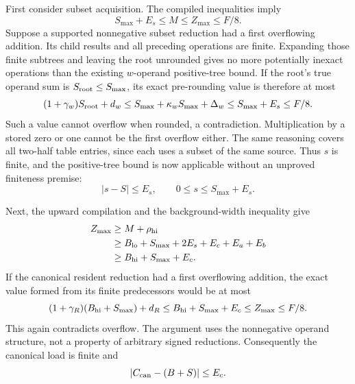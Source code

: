 \documentclass[11pt]{article}
\begin{document}
First consider subset acquisition. The compiled inequalities imply
\begin{equation}
S_{\max}+E_s\le M\le Z_{\max}\le F/8.
\label{eq:uniform-subset-margin}
\end{equation}
Suppose a supported nonnegative subset reduction had a first overflowing addition. Its child results and all preceding operations are finite. Expanding those finite subtrees and leaving the root unrounded gives no more potentially inexact operations than the existing $w$-operand positive-tree bound. If the root's true operand sum is $S_{\rm root}\le S_{\max}$, its exact pre-rounding value is therefore at most
\begin{equation}
(1+\gamma_w)S_{\rm root}+d_w
\le S_{\max}+\kappa_wS_{\max}+\Delta_w
\le S_{\max}+E_s
\le F/8.
\end{equation}
Such a value cannot overflow when rounded, a contradiction. Multiplication by a stored zero or one cannot be the first overflow either. The same reasoning covers all two-half table entries, since each uses a subset of the same source. Thus $s$ is finite, and the positive-tree bound is now applicable without an unproved finiteness premise:
\begin{equation}
|s-S|\le E_s,\qquad 0\le s\le S_{\max}+E_s.
\label{eq:uniform-subset-error}
\end{equation}

Next, the upward compilation and the background-width inequality give
\begin{align}
Z_{\max}
&\ge M+\rho_{\rm hi}\nonumber\\
&\ge B_{\rm lo}+S_{\max}+2E_s+E_c+E_a+E_b\nonumber\\
&\ge B_{\rm hi}+S_{\max}+E_c.
\label{eq:uniform-canonical-margin}
\end{align}
If the canonical resident reduction had a first overflowing addition, the exact value formed from its finite predecessors would be at most
\begin{equation}
(1+\gamma_R)(B_{\rm hi}+S_{\max})+d_R
\le B_{\rm hi}+S_{\max}+E_c
\le Z_{\max}\le F/8.
\end{equation}
This again contradicts overflow. The argument uses the nonnegative operand structure, not a property of arbitrary signed reductions. Consequently the canonical load is finite and
\begin{equation}
|C_{\rm can}-(B+S)|\le E_c.
\label{eq:uniform-canonical-error}
\end{equation}
\end{document}
